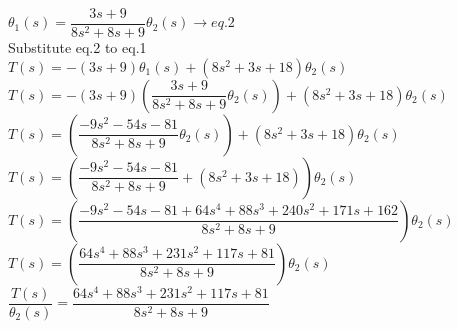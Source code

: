 \documentclass[11pt,letterpaper]{article}
\begin{document}
					$\theta_1(s)=\dfrac{3s+9}{8s^2+8s+9}\theta_2(s)  \rightarrow eq.2$\\

					Substitute eq.2 to eq.1\\

					$T(s)=-(3s+9)\theta_1(s)+(8s^2+3s+18)\theta_2(s)$\\

					$T(s)=-(3s+9)\left(\dfrac{3s+9}{8s^2+8s+9}\theta_2(s)\right)+(8s^2+3s+18)\theta_2(s)$\\

					$T(s)=\left(\dfrac{-9s^2-54s-81}{8s^2+8s+9}\theta_2(s)\right)+(8s^2+3s+18)\theta_2(s)$\\

					$T(s)=\left(\dfrac{-9s^2-54s-81}{8s^2+8s+9}+(8s^2+3s+18)\right)\theta_2(s)$\\

					$T(s)=\left(\dfrac{-9s^2-54s-81+64s^4+88s^3+240s^2+171s+162}{8s^2+8s+9}\right)\theta_2(s)$\\

					$T(s)=\left(\dfrac{64s^4+88s^3+231s^2+117s+81}{8s^2+8s+9}\right)\theta_2(s)$\\

					$\dfrac{T(s)}{\theta_2(s)}=\dfrac{64s^4+88s^3+231s^2+117s+81}{8s^2+8s+9}$\\

					\\
			
\end{document}
